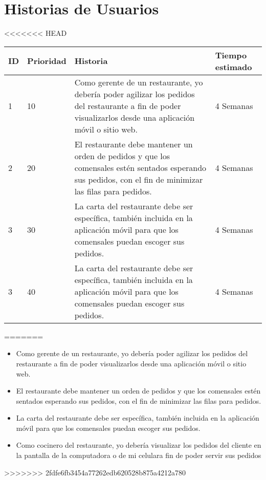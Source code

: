 \chapter{Historias de Usuarios}
<<<<<<< HEAD


\begin{table}[htbp]
	\begin{center}
		\begin{tabular}{| p{1.0cm}| p{2.0cm} | p{7.0cm}| p{4.0cm} |}
			\hline
			
			\textbf{ID} & \textbf {Prioridad} & \textbf{Historia} & \textbf{Tiempo estimado}
			
			\\\hline
			1 & 10 &
			
			Como gerente de un restaurante, yo debería poder agilizar los pedidos del restaurante a fin de poder visualizarlos desde una aplicación móvil o sitio web.
			
			& 4 Semanas
			
			\\\hline
			2 & 20 & 
			
			El restaurante debe mantener un orden de pedidos y que los comensales estén sentados esperando sus pedidos, con el fin de minimizar las filas para pedidos.
			
			& 4 Semanas
			
			\\\hline
			3 & 30	& 
			
			La carta del restaurante debe ser específica, también incluida en la aplicación móvil para que los comensales puedan escoger sus pedidos.
			
			& 4 Semanas
			
			\\\hline
			3 & 40	& 
			
			La carta del restaurante debe ser específica, también incluida en la aplicación móvil para que los comensales puedan escoger sus pedidos.
			
			& 4 Semanas \\\hline
		\end{tabular}
	\end{center}
\end{table}
=======
\begin{itemize}
	\item Como gerente de un restaurante, yo debería poder agilizar los pedidos del restaurante a fin de poder visualizarlos desde una aplicación móvil o sitio web.
	\item El restaurante debe mantener un orden de pedidos y que los comensales estén sentados esperando sus pedidos, con el fin de minimizar las filas para pedidos.
	\item La carta del restaurante debe ser específica, también incluida en la aplicación móvil para que los comensales puedan escoger sus pedidos.
	\item Como cocinero del restaurante, yo debería visualizar los pedidos del cliente en la pantalla de la computadora o de mi celulara fin de poder servir sus pedidos\end{itemize}
>>>>>>> 2fdfe6fb3454a77262edb620528b875a4212a780
